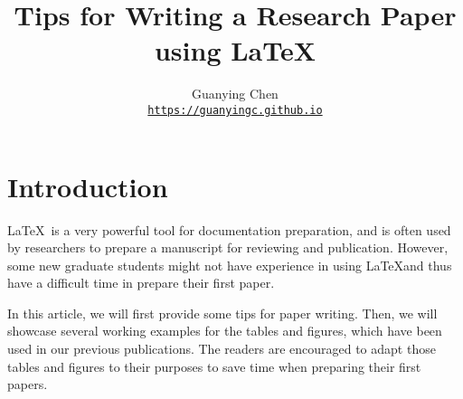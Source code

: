 \documentclass[10pt,twocolumn,letterpaper]{article}
\begin{document}
\title{Tips for Writing a Research Paper using \LaTeX}

\author{Guanying Chen \\
{\tt\small \url{https://guanyingc.github.io}}
}
\maketitle
{
    \hypersetup{linkcolor=black}
    \tableofcontents
}



\vspace{6em}
\section{Introduction}
\label{sec:intro}
\LaTeX\ is a very powerful tool for documentation preparation, and is often used by researchers to prepare a manuscript for reviewing and publication. 
However, some new graduate students might not have experience in using \LaTeX and thus have a difficult time in prepare their first paper. 

In this article, we will first provide some tips for paper writing.  
Then, we will showcase several working examples for the tables and figures, which have been used in our previous publications. The readers are encouraged to adapt those tables and figures to their purposes to save time when preparing their first papers.
\end{document}

